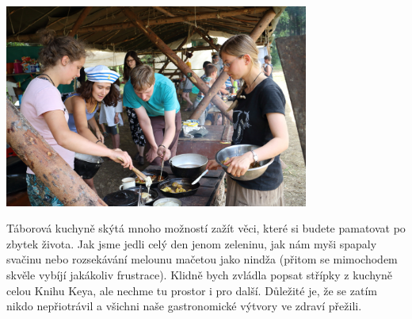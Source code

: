 \begin{center}

\includegraphics[width=10cm]{img/udo_clanky/kuchyne1.JPG}

\end{center}



Táborová kuchyně skýtá mnoho možností zažít věci, které si budete pamatovat po zbytek života. Jak jsme jedli celý den jenom zeleninu, jak nám myši spapaly svačinu nebo rozsekávání melounu mačetou jako nindža (přitom se mimochodem skvěle vybíjí jakákoliv frustrace). Klidně bych zvládla popsat střípky z kuchyně celou Knihu Keya, ale nechme tu prostor i pro další. Důležité je, že se zatím nikdo nepřiotrávil a všichni naše gastronomické výtvory ve zdraví přežili. 

